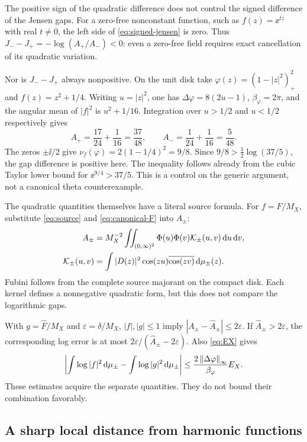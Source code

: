 The positive sign of the quadratic difference does not control
the signed difference of the Jensen gaps. For a zero-free
nonconstant function, such as $f(z)=\ee^{tz}$ with real $t\ne0$,
the left side of \eqref{eq:signed-jensen} is zero. Thus
$J_--J_+=-\log(A_+/A_-)<0$: even a zero-free field requires
exact cancellation of its quadratic variation.

Nor is $J_--J_+$ always nonpositive. On the unit disk take
$\varphi(z)=(1-|z|^2)_+^2$ and $f(z)=z^2+1/4$.
Writing $u=|z|^2$, one has
$\Delta\varphi=8(2u-1)$, $\beta_\varphi=2\pi$, and the
angular mean of $|f|^2$ is $u^2+1/16$.
Integration over $u>1/2$ and $u<1/2$ respectively gives
\[
 A_+=\frac{17}{24}+\frac1{16}=\frac{37}{48},\qquad
 A_-=\frac1{24}+\frac1{16}=\frac5{48}.
\]
The zeros $\pm\ii/2$ give
$\nu_f(\varphi)=2(1-1/4)^2=9/8$.
Since $9/8>\frac12\log(37/5)$, the gap difference is positive
here. The inequality follows already from the cubic Taylor lower
bound for $\ee^{9/4}>37/5$. This is a control on the generic
argument, not a canonical theta counterexample.

The quadratic quantities themselves have a literal source formula.
For $f=F/M_X$, substitute \eqref{eq:source} and
\eqref{eq:canonical-F} into $A_\pm$:
\begin{align}
 A_\pm&=M_X^{-2}\iint_{(0,\infty)^2}
               \Phi(u)\Phi(v)\mathcal K_\pm(u,v)\,\mathrm d u\,\mathrm d v,\label{eq:quadratic-source}\\
 \mathcal K_\pm(u,v)&=
       \int |D(z)|^2\cos(zu)\overline{\cos(zv)}\,\mathrm d\mu_\pm(z).\notag
\end{align}
Fubini follows from the complete source majorant on the compact
disk. Each kernel defines a nonnegative quadratic form, but this
does not compare the logarithmic gaps.

With $g=\widehat F/M_X$ and $\varepsilon=\delta/M_X$,
$|f|,|g|\le1$ imply $|A_\pm-\widehat A_\pm|\le2\varepsilon$.
If $\widehat A_\pm>2\varepsilon$, the corresponding log error is at
most $2\varepsilon/(\widehat A_\pm-2\varepsilon)$.
Also \eqref{eq:EX} gives
\[
 \left|\int\log|f|^2\,\mathrm d\mu_\pm-
               \int\log|g|^2\,\mathrm d\mu_\pm\right|
 \le\frac{2\left\|\Delta\varphi\right\|_\infty}{\beta_\varphi}E_X.
\]
These estimates acquire the separate quantities. They do not
bound their combination favorably.

\subsection{A sharp local distance from harmonic functions}

